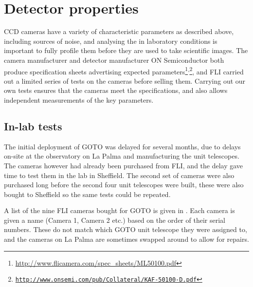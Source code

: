 \section{Detector properties}
\label{sec:detectors}
\begin{colsection}


\begin{colsection}

CCD cameras have a variety of characteristic parameters as described above, including sources of noise, and analysing the in laboratory conditions is important to fully profile them before they are used to take scientific images. The camera manufacturer  and detector manufacturer ON Semiconductor both produce specification sheets advertising expected parameters\footnote{\url{http://www.flicamera.com/spec_sheets/ML50100.pdf}}\textsuperscript{,}\footnote{\href{http://www.onsemi.com/pub/Collateral/KAF-50100-D.PDF}{\texttt{http://www.onsemi.com/pub/Collateral/KAF-50100-D.pdf}}}, and FLI carried out a limited series of tests on the cameras before selling them. Carrying out our own tests ensures that the cameras meet the specifications, and also allows independent measurements of the key parameters.

\end{colsection}

\subsection{In-lab tests}
\label{sec:camera_tests}
\begin{colsection}

The initial deployment of GOTO was delayed for several months, due to delays on-site at the observatory on La Palma and manufacturing the unit telescopes. The cameras however had already been purchased from FLI, and the delay gave time to test them in the lab in Sheffield. The second set of cameras were also purchased long before the second four unit telescopes were built, these were also bought to Sheffield so the same tests could be repeated.

A list of the nine FLI cameras bought for GOTO is given in . Each camera is given a name (Camera 1, Camera 2 etc.) based on the order of their serial numbers. These do not match which GOTO unit telescope they were assigned to, and the cameras on La Palma are sometimes swapped around to allow for repairs.


\end{colsection}
\end{colsection}
